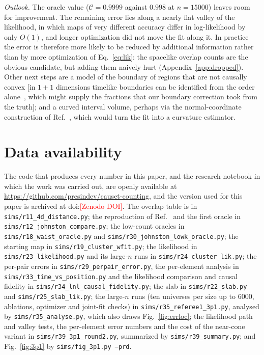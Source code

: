 \documentclass[prd,twocolumn,superscriptaddress,nofootinbib,amsmath,amssymb,floatfix]{revtex4-2}
\newcommand{\pending}[1]{\textcolor{red}{[#1]}}
\begin{document}
\emph{Outlook.} The oracle value ($\mathcal C=0.9999$ against $0.998$ at $n=15000$) leaves room for improvement. The remaining error lies along a nearly flat valley of the likelihood, in which maps of very different accuracy differ in log-likelihood by only $O(1)$, and longer optimization did not move the fit along it. In practice the error is therefore more likely to be reduced by additional information rather than by more optimization of Eq.~\eqref{eq:lik}: the spacelike overlap counts are the obvious candidate, but adding them naively hurt (Appendix~\ref{app:dropped}). Other next steps are a model of the boundary of regions that are not causally convex [in $1+1$ dimensions timelike boundaries can be identified from the order alone~\cite{Cunningham18}, which might supply the fractions that our boundary correction took from the truth]; and a curved interval volume, perhaps via the normal-coordinate construction of Ref.~\cite{Madsen26}, which would turn the fit into a curvature estimator.

\section*{Data availability}
The code that produces every number in this paper, and the research notebook in which the work was carried out, are openly available at \url{https://github.com/presindev/causet-counting}, and the version used for this paper is archived at doi:\pending{Zenodo DOI}. The overlap table is in \texttt{sims/r11\_4d\_distance.py}; the reproduction of Ref.~\cite{Johnston25} and the first oracle in \texttt{sims/r12\_johnston\_compare.py}; the low-count oracles in \texttt{sims/r18\_waist\_oracle.py} and \texttt{sims/r30\_johnston\_lowk\_oracle.py}; the starting map in \texttt{sims/r19\_cluster\_wfit.py}; the likelihood in \texttt{sims/r23\_likelihood.py} and its large-$n$ runs in \texttt{sims/r24\_cluster\_lik.py}; the per-pair errors in \texttt{sims/r29\_perpair\_error.py}, the per-element analysis in \texttt{sims/r33\_time\_vs\_position.py} and the likelihood comparison and causal fidelity in \texttt{sims/r34\_lnl\_causal\_fidelity.py}; the slab in \texttt{sims/r22\_slab.py} and \texttt{sims/r25\_slab\_lik.py}; the large-$n$ runs (ten universes per size up to $6000$, ablations, optimizer and joint-fit checks) in \texttt{sims/r35\_referee1\_3p1.py}, analysed by \texttt{sims/r35\_analyse.py}, which also draws Fig.~\ref{fig:errloc}; the likelihood path and valley tests, the per-element error numbers and the cost of the near-cone variant in \texttt{sims/r39\_3p1\_round2.py}, summarized by \texttt{sims/r39\_summary.py}; and Fig.~\ref{fig:3p1} by \texttt{sims/fig\_3p1.py --prd}.
\end{document}
